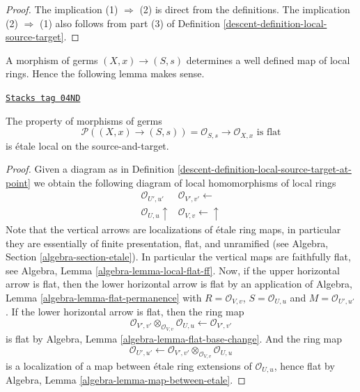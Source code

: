 \begin{proof}

The implication (1) $\Rightarrow$ (2) is direct from the definitions.
The implication (2) $\Rightarrow$ (1) also follows from part (3) of
Definition \ref{descent-definition-local-source-target}.
\end{proof}

A morphism of germs $(X, x) \to (S, s)$ determines a well defined
map of local rings. Hence the following lemma makes sense.

\begin{lemma}
\label{descent-lemma-flat-at-point}
\href{https://stacks.math.columbia.edu/tag/04ND}{\texttt{Stacks tag 04ND}}

The property of morphisms of germs
$$
\mathcal{P}((X, x) \to (S, s)) =
\mathcal{O}_{S, s} \to \mathcal{O}_{X, x}\text{ is flat}
$$
is \'etale local on the source-and-target.
\end{lemma}

\begin{proof}

Given a diagram as in
Definition \ref{descent-definition-local-source-target-at-point}
we obtain the following diagram of local homomorphisms of local rings
$$
\begin{array}{cc}\mathcal{O}_{U', u'} & \mathcal{O}_{V', v'} \longleftarrow \\ \mathcal{O}_{U, u} \uparrow & \mathcal{O}_{V, v} \longleftarrow\uparrow\end{array}
$$
Note that the vertical arrows are localizations of \'etale ring maps,
in particular they are essentially of finite presentation, flat,
and unramified (see
Algebra, Section \ref{algebra-section-etale}).
In particular the vertical maps are faithfully flat, see
Algebra, Lemma \ref{algebra-lemma-local-flat-ff}.
Now, if the upper horizontal arrow is flat, then the lower horizontal
arrow is flat by an application of
Algebra, Lemma \ref{algebra-lemma-flat-permanence}
with $R = \mathcal{O}_{V, v}$, $S = \mathcal{O}_{U, u}$ and
$M = \mathcal{O}_{U', u'}$. If the lower horizontal arrow is
flat, then the ring map
$$
\mathcal{O}_{V', v'} \otimes_{\mathcal{O}_{V, v}} \mathcal{O}_{U, u}
\longleftarrow
\mathcal{O}_{V', v'}
$$
is flat by
Algebra, Lemma \ref{algebra-lemma-flat-base-change}.
And the ring map
$$
\mathcal{O}_{U', u'}
\longleftarrow
\mathcal{O}_{V', v'} \otimes_{\mathcal{O}_{V, v}} \mathcal{O}_{U, u}
$$
is a localization of a map between \'etale ring extensions of
$\mathcal{O}_{U, u}$, hence flat by
Algebra, Lemma \ref{algebra-lemma-map-between-etale}.
\end{proof}

